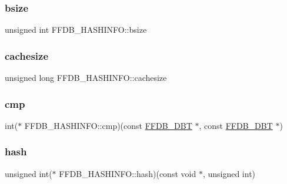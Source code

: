 \subsubsection{\texorpdfstring{bsize}{bsize}}
{\footnotesize\ttfamily unsigned int F\+F\+D\+B\+\_\+\+H\+A\+S\+H\+I\+N\+F\+O\+::bsize}

\mbox{\label{structFFDB__HASHINFO_aa04759ec519e79ce156d42660acafb7f}} 
\subsubsection{\texorpdfstring{cachesize}{cachesize}}
{\footnotesize\ttfamily unsigned long F\+F\+D\+B\+\_\+\+H\+A\+S\+H\+I\+N\+F\+O\+::cachesize}

\mbox{\label{structFFDB__HASHINFO_a2c214c2327e467cdb235487f023ddc78}} 
\subsubsection{\texorpdfstring{cmp}{cmp}}
{\footnotesize\ttfamily int($\ast$ F\+F\+D\+B\+\_\+\+H\+A\+S\+H\+I\+N\+F\+O\+::cmp)(const \mbox{\hyperlink{other__libs_2filedb_2filehash_2ffdb__db_8h_aa2e0984399491df0fdd20898ca8758f9}{F\+F\+D\+B\+\_\+\+D\+BT}} $\ast$, const \mbox{\hyperlink{other__libs_2filedb_2filehash_2ffdb__db_8h_aa2e0984399491df0fdd20898ca8758f9}{F\+F\+D\+B\+\_\+\+D\+BT}} $\ast$)}

\mbox{\label{structFFDB__HASHINFO_af4b51f3d6131122f6f375d688d6752aa}} 
\subsubsection{\texorpdfstring{hash}{hash}}
{\footnotesize\ttfamily unsigned int($\ast$ F\+F\+D\+B\+\_\+\+H\+A\+S\+H\+I\+N\+F\+O\+::hash)(const void $\ast$, unsigned int)}

\mbox{\label{structFFDB__HASHINFO_aa4a10df8b4ccdd1ac58b4655a943db0d}} 
